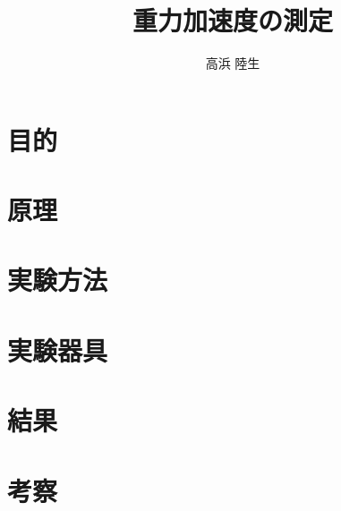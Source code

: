 \documentclass[12pt]{jarticle}
\begin{document}
\title{重力加速度の測定}
\author{高浜 陸生}
\maketitle
\newpage
\section{目的}

\section{原理}

\section{実験方法}

\section{実験器具}

\section{結果}

\section{考察}
\end{document}
